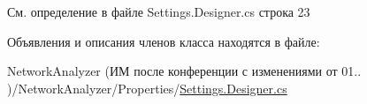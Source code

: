См. определение в файле Settings.\+Designer.\+cs строка 23



Объявления и описания членов класса находятся в файле\+:\begin{DoxyCompactItemize}
\item 
Network\+Analyzer (ИМ после конференции  с изменениями от 01.. )/\+Network\+Analyzer/\+Properties/\hyperlink{_settings_8_designer_8cs}{Settings.\+Designer.\+cs}\end{DoxyCompactItemize}
